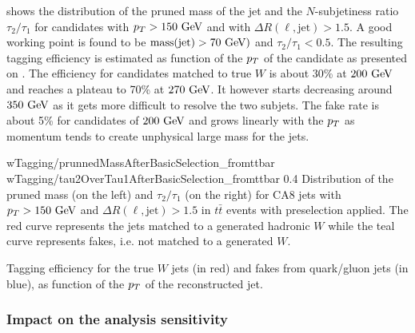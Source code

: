              shows the distribution of the pruned mass of
            the jet and the $N$-subjetiness ratio $\tau_2 / \tau_1$ for candidates with
            $p_T > 150~\text{GeV}$ and with $\Delta R(\ell,\text{jet}) > 1.5$. A good working point
            is found to be $\text{mass}(\text{jet}) > 70~\text{GeV})$ and $\tau_2 / \tau_1 < 0.5$.
            The resulting tagging efficiency is estimated as function of the $p_T$ of the
            candidate as presented on .
            The efficiency for candidates matched
            to true $W$ is about 30\% at $200~\text{GeV}$ and reaches a plateau to 70\% at $270~\text{GeV}$. It
            however starts decreasing around $350~\text{GeV}$ as it gets more difficult to resolve
            the two subjets. The fake rate is about 5\% for candidates of $200~\text{GeV}$ and
            grows linearly with the $p_T$ as momentum tends to create unphysical large
            mass for the jets.

                             {wTagging/prunnedMassAfterBasicSelection_fromttbar}
                             {wTagging/tau2OverTau1AfterBasicSelection_fromttbar}
                             {0.4}
                             {Distribution of the pruned mass (on the left) and $\tau_2
                             / \tau_1$ (on the right) for CA8 jets with $p_T > 150~\text{GeV}$ and
                             $\Delta R(\ell,\text{jet}) > 1.5$ in $t\bar{t}$ events
                             with preselection applied. The red curve represents the
                             jets matched to a generated hadronic $W$ while the teal
                             curve represents fakes, i.e. not matched to a generated $W$.}

                         {Tagging efficiency for the true $W$ jets (in red) and fakes from quark/gluon
                         jets (in blue), as function of the $p_T$ of the reconstructed jet.}

            \subsubsection{Impact on the analysis sensitivity}

